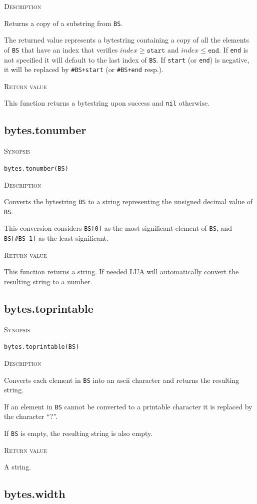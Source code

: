 \documentclass[11pt]{report}
\newcommand{\mansection}[1]{\vspace{0.5em}\par\noindent\textsc{#1}\vspace{0.5em}\par}
\newcommand{\syn}[1]{\texttt{#1}}
\begin{document}
\mansection{Description}
  Returns a copy of a substring from \syn{BS}.

  The returned value represents a bytestring containing a copy of all the 
  elements of \syn{BS} that have an index that verifies $index \geq \syn{start}$ and 
  $index \leq \syn{end}$.
  If \syn{end} is not specified it will default to the last index of \syn{BS}.
  If \syn{start} (or \syn{end}) is negative, it will be replaced by \syn{\#BS+start}
  (or \syn{\#BS+end} resp.).

\mansection{Return value}
  This function returns a bytestring upon success and \syn{nil} otherwise.


\subsection{bytes.tonumber}

\mansection{Synopsis}
\syn{bytes.tonumber(BS)}

\mansection{Description}
  Converts the bytestring \syn{BS} to a string representing the unsigned 
  decimal value of \syn{BS}.

  This conversion considers \syn{BS[0]} as the most significant element of \syn{BS}, 
  and \syn{BS[\#BS-1]} as the least significant. 
  
\mansection{Return value}
  This function returns a string.
  If needed LUA will automatically convert the resulting string to a number.


\subsection{bytes.toprintable}

\mansection{Synopsis}
\syn{bytes.toprintable(BS)}

\mansection{Description}
  Converts each element in \syn{BS} into an ascii character and returns the
  resulting string.

  If an element in \syn{BS} cannot be converted to a printable character it
  is replaced by the character ``?''. 

  If \syn{BS} is empty, the resulting string is also empty.

\mansection{Return value}
  A string.


\subsection{bytes.width}
\end{document}

